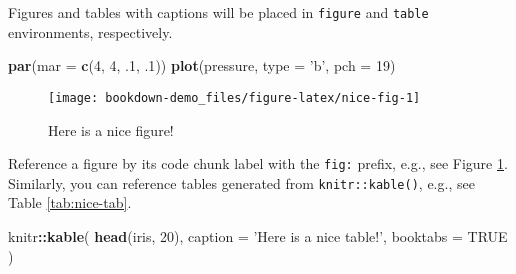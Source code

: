 \documentclass[
]{book}
\newenvironment{Shaded}{\begin{snugshade}}{\end{snugshade}}
\newcommand{\DataTypeTok}[1]{\textcolor[rgb]{0.13,0.29,0.53}{#1}}
\newcommand{\DecValTok}[1]{\textcolor[rgb]{0.00,0.00,0.81}{#1}}
\newcommand{\FloatTok}[1]{\textcolor[rgb]{0.00,0.00,0.81}{#1}}
\newcommand{\KeywordTok}[1]{\textcolor[rgb]{0.13,0.29,0.53}{\textbf{#1}}}
\newcommand{\NormalTok}[1]{#1}
\newcommand{\OperatorTok}[1]{\textcolor[rgb]{0.81,0.36,0.00}{\textbf{#1}}}
\newcommand{\OtherTok}[1]{\textcolor[rgb]{0.56,0.35,0.01}{#1}}
\newcommand{\StringTok}[1]{\textcolor[rgb]{0.31,0.60,0.02}{#1}}
\begin{document}
Figures and tables with captions will be placed in \texttt{figure} and \texttt{table} environments, respectively.

\begin{Shaded}
\begin{Highlighting}[]
\KeywordTok{par}\NormalTok{(}\DataTypeTok{mar =} \KeywordTok{c}\NormalTok{(}\DecValTok{4}\NormalTok{, }\DecValTok{4}\NormalTok{, }\FloatTok{.1}\NormalTok{, }\FloatTok{.1}\NormalTok{))}
\KeywordTok{plot}\NormalTok{(pressure, }\DataTypeTok{type =} \StringTok{'b'}\NormalTok{, }\DataTypeTok{pch =} \DecValTok{19}\NormalTok{)}
\end{Highlighting}
\end{Shaded}

\begin{figure}

{\centering \texttt{[image: bookdown-demo\_files/figure-latex/nice-fig-1]} 

}

\caption{Here is a nice figure!}\label{fig:nice-fig}
\end{figure}

Reference a figure by its code chunk label with the \texttt{fig:} prefix, e.g., see Figure \ref{fig:nice-fig}. Similarly, you can reference tables generated from \texttt{knitr::kable()}, e.g., see Table \ref{tab:nice-tab}.

\begin{Shaded}
\begin{Highlighting}[]
\NormalTok{knitr}\OperatorTok{::}\KeywordTok{kable}\NormalTok{(}
  \KeywordTok{head}\NormalTok{(iris, }\DecValTok{20}\NormalTok{), }\DataTypeTok{caption =} \StringTok{'Here is a nice table!'}\NormalTok{,}
  \DataTypeTok{booktabs =} \OtherTok{TRUE}
\NormalTok{)}
\end{Highlighting}
\end{Shaded}
\end{document}
